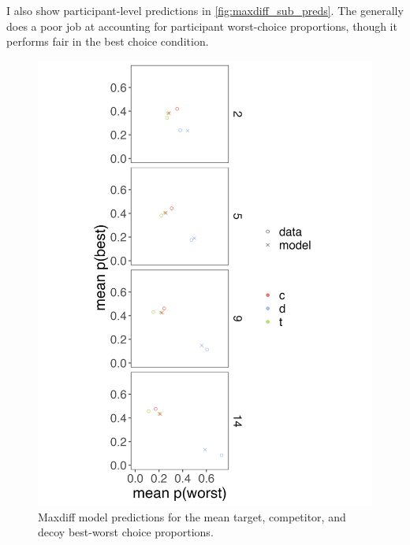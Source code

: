 I also show participant-level predictions in \ref{fig:maxdiff_sub_preds}. The generally does a poor job at accounting for participant worst-choice proportions, though it performs fair in the best choice condition. 
\begin{figure}
   \includegraphics[width=\linewidth]{figures/maxdiff_2_means_model_v_data.jpeg}
   \caption{Maxdiff model predictions for the mean target, competitor, and decoy best-worst choice proportions.}
   \label{fig:maxdiff_collapsed_preds}
\end{figure}

